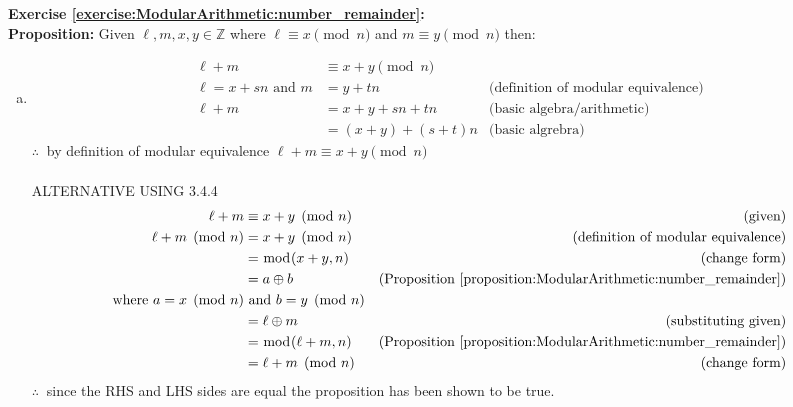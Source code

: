 \noindent\textbf{Exercise \ref{exercise:ModularArithmetic:number_remainder}:}\\ %
\textbf{Proposition:} Given $\ell, m, x, y \in {\mathbb Z}$ where $\ell \equiv x\pmod{n}$ and $m \equiv y \pmod{n}$ then:\\
\begin{enumerate}[(a)]
\item 
\begin{align*} 
\ell + m &\equiv x + y\pmod{n}\\
\ell = x + sn \text{\ and\ } m &= y + tn  &\text{(definition of modular equivalence)}\\
\ell + m &= x + y + sn + tn &\text{(basic algebra/arithmetic)}\\
&=(x + y) + (s + t)n &\text{(basic algrebra)}
\end{align*}
$\therefore\ $ by definition of modular equivalence $\ell + m \equiv x + y \pmod{n}$\\
\\
ALTERNATIVE USING 3.4.4
\begin{align*} 
\ell + m &\equiv x + y\pmod{n} &\text{(given)}\\
\ell + m \pmod{n} &= x + y\pmod{n}  &\text{(definition of modular equivalence)}\\
&= \bmod(x + y, n)  &\text{(change form)}\\
&= a \oplus b &\text{(Proposition~\ref{proposition:ModularArithmetic:number_remainder})}\\
\text{where\ } a = x\pmod{n} &\text{\ and\ } b = y\pmod{n}\\
&= \ell \oplus m &\text{(substituting given)}\\
&= \bmod(\ell + m, n) &\text{(Proposition~\ref{proposition:ModularArithmetic:number_remainder})}\\
&= \ell + m\pmod{n} &\text{(change form)}
\end{align*}
$\therefore\ $ since the RHS and LHS sides are equal the proposition has been shown to be true.


\end{enumerate}
